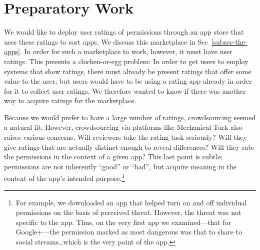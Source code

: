 \documentclass[11pt]{article}
\begin{document}

\section{Preparatory Work}
\label{sec-prep-work}

We would like to deploy user ratings of permissions
through an app store that uses these ratings to sort
apps. We discuss this marketplace in Sec~\ref{subsec-the-apps}.
In order for such a marketplace to work, however, it must have user
ratings. This presents a chicken-or-egg problem: In order to get users
to employ systems that show ratings, there must already be present
ratings that offer some value to the user; but users would have to be
using a rating app already in order for it to collect user
ratings. We therefore wanted to know if there was another way to
acquire ratings for the marketplace.

Because we would prefer to have a large number of ratings,
crowdsourcing seemed a natural fit. However, crowdsourcing via
platforms like Mechanical Turk also raises various concerns. Will
reviewers take the rating task seriously? Will they give ratings that
are actually distinct enough to reveal differences? Will they rate the
permissions in the context of a given app? This last point is subtle: permissions are
not inherently ``good'' or ``bad'', but acquire meaning in the context
of the app's intended purpose.\footnote{For example, we
  downloaded an app that helped turn on and off individual permissions
  on the basis of perceived threat. However, the threat was not
  specific to the app. Thus, on the very first app we examined---that
  for Google+---the permission marked as most dangerous was that to
  share to social streams\dots which is the very point of the app.}
\end{document}
